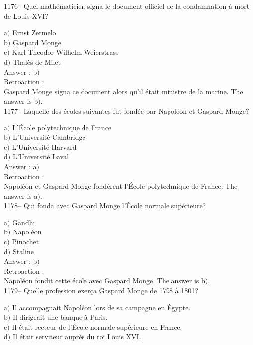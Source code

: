 ﻿\documentclass[letterpaper, 12pt]{article}
\begin{document}
1176-- Quel math\'ematicien signa le document officiel de la
condamnation \`a mort de Louis XVI?

a$)$ Ernst Zermelo \\
b$)$ Gaspard Monge \\
c$)$ Karl Theodor Wilhelm Weierstrass  \\
d$)$ Thal\`es de Milet\\

Answer : b$)$\\

Retroaction : \\
Gaspard Monge signa ce document alors qu'il \'etait ministre de la
marine.
The answer is b$)$.\\

1177-- Laquelle des \'ecoles suivantes fut fond\'ee par Napol\'eon
et Gaspard Monge?

a$)$ L'\'Ecole polytechnique de France \\
b$)$ L'Universit\'e Cambridge \\
c$)$ L'Universit\'e Harvard \\
d$)$ L'Universit\'e Laval\\

Answer : a$)$\\

Retroaction : \\
Napol\'eon et Gaspard Monge fond\`erent l'\'Ecole polytechnique de
France.
The answer is a$)$.\\

1178-- Qui fonda avec Gaspard Monge l'\'Ecole normale sup\'erieure?

a$)$ Gandhi \\
b$)$ Napol\'eon \\
c$)$ Pinochet \\
d$)$ Staline\\

Answer : b$)$\\

Retroaction : \\
Napol\'eon fondit cette \'ecole avec Gaspard Monge.
The answer is b$)$.\\

1179-- Quelle profession exer\c ca Gaspard Monge de 1798 \`a 1801?

a$)$ Il accompagnait Napol\'eon lors de sa campagne en \'Egypte. \\
b$)$ Il dirigeait une banque \`a Paris. \\
c$)$ Il \'etait recteur de l'\'Ecole normale sup\'erieure en France. \\
d$)$ Il \'etait serviteur aupr\`es du roi Louis XVI. \\
\end{document}
